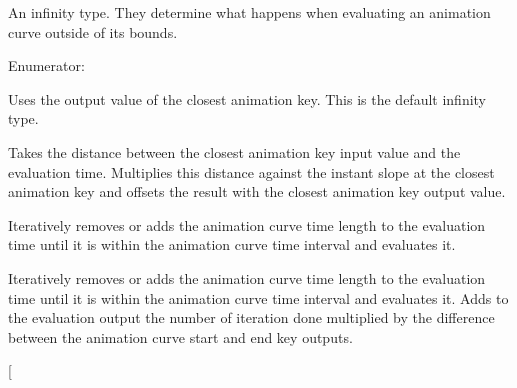 An infinity type. They determine what happens when evaluating an animation curve outside of its bounds. \begin{Desc}
\item[Enumerator: ]\par
\begin{description}
\item[{\em 
\hypertarget{namespaceFUDaeInfinity_a9d8fb86affe94d1586d728d4c2e89008ac57389e1772b6bda01dbd602b221df47}{
CONSTANT}
\label{namespaceFUDaeInfinity_a9d8fb86affe94d1586d728d4c2e89008ac57389e1772b6bda01dbd602b221df47}
}]Uses the output value of the closest animation key. This is the default infinity type. \item[{\em 
\hypertarget{namespaceFUDaeInfinity_a9d8fb86affe94d1586d728d4c2e89008a1858c6f256ea4a23240a4fedd1099d61}{
LINEAR}
\label{namespaceFUDaeInfinity_a9d8fb86affe94d1586d728d4c2e89008a1858c6f256ea4a23240a4fedd1099d61}
}]Takes the distance between the closest animation key input value and the evaluation time. Multiplies this distance against the instant slope at the closest animation key and offsets the result with the closest animation key output value. \item[{\em 
\hypertarget{namespaceFUDaeInfinity_a9d8fb86affe94d1586d728d4c2e89008a219f140587c9b90e29c73d0aa2debae9}{
CYCLE}
\label{namespaceFUDaeInfinity_a9d8fb86affe94d1586d728d4c2e89008a219f140587c9b90e29c73d0aa2debae9}
}]Iteratively removes or adds the animation curve time length to the evaluation time until it is within the animation curve time interval and evaluates it. \item[{\em 
\hypertarget{namespaceFUDaeInfinity_a9d8fb86affe94d1586d728d4c2e89008a9c1ce1c8dbaf7010eb813f77057260b4}{
CYCLE\_\-RELATIVE}
\label{namespaceFUDaeInfinity_a9d8fb86affe94d1586d728d4c2e89008a9c1ce1c8dbaf7010eb813f77057260b4}
}]Iteratively removes or adds the animation curve time length to the evaluation time until it is within the animation curve time interval and evaluates it. Adds to the evaluation output the number of iteration done multiplied by the difference between the animation curve start and end key outputs. \item[{\em 
}
\end{description}
\end{Desc}
